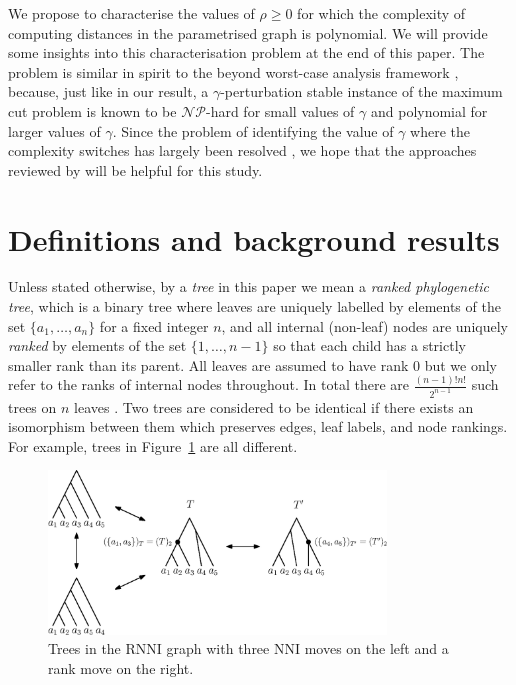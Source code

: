 \documentclass[11pt]{amsart}
\newcommand{\rnni}{\mathrm{RNNI}}
\newcommand{\nni}{\mathrm{NNI}}
\newcommand{\np}{\mathcal{NP}}
\newcommand{\summary}[1]{} %
\begin{document}
We propose to characterise the values of $\rho \geq 0$ for which the complexity of computing distances in the parametrised graph is polynomial.
We will provide some insights into this characterisation problem at the end of this paper.
The problem is similar in spirit to the beyond worst-case analysis framework \autocite{Roughgarden2019-to}, because, just like in our result, a $\gamma$-perturbation stable instance of the maximum cut problem is known \autocite{Roughgarden2019-to} to be $\np$-hard for small values of $\gamma$ and polynomial for larger values of $\gamma$.
Since the problem of identifying the value of $\gamma$ where the complexity switches has largely been resolved \autocite{Makarychev2014-ev}, we hope that the approaches reviewed by \textcite{Roughgarden2019-to} will be helpful for this study.


\section{Definitions and background results}

\summary{Defining ranked trees and clusters.}
Unless stated otherwise, by a \emph{tree} in this paper we mean a \emph{ranked phylogenetic tree}, which is a binary tree where leaves are uniquely labelled by elements of the set $\{a_1, \ldots, a_n\}$ for a fixed integer $n$, and all internal (non-leaf) nodes are uniquely \emph{ranked} by elements of the set $\{1, \ldots, n-1\}$ so that each child has a strictly smaller rank than its parent.
All leaves are assumed to have rank $0$ but we only refer to the ranks of internal nodes throughout.
In total there are $\frac{(n - 1)! n!}{2^{n-1}}$ such trees on $n$ leaves \autocite{Gavryushkin2018-ol}.
Two trees are considered to be identical if there exists an isomorphism between them which preserves edges, leaf labels, and node rankings.
For example, trees in Figure~\ref{fig:ranked_trees_ex} are all different.

\begin{figure}[ht]
\centering
\includegraphics[width=0.8\textwidth]{ranked_trees_ex}
\caption{Trees in the $\rnni$ graph with three $\nni$ moves on the left and a rank move on the right.}
\label{fig:ranked_trees_ex}
\end{figure}
\end{document}
